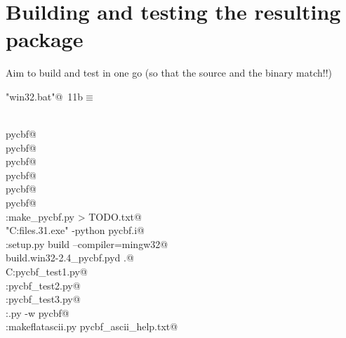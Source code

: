 \documentclass[10pt,a4paper,twoside,notitlepage]{article}
\begin{document}
\section{Building and testing the resulting package}

Aim to build and test in one go (so that the source and the binary match!!)

\begin{flushleft} \small
\begin{minipage}{\linewidth}\label{scrap10}\raggedright\small
{} \verb@"win32.bat"@\nobreak\ {\footnotesize {11b}}$\equiv$
\vspace{-1ex}
\begin{list}{}{} \item
\mbox{}\verb@@\\
\mbox{}\verb@nuweb pycbf@\\
\mbox{}\verb@latex pycbf@\\
\mbox{}\verb@nuweb pycbf@\\
\mbox{}\verb@latex pycbf@\\
\mbox{}\verb@dvipdfm pycbf@\\
\mbox{}\verb@nuweb pycbf@\\
\mbox{}\verb@C:\python make_pycbf.py > TODO.txt@\\
\mbox{}\verb@"C:\program files.31\swig.exe" -python pycbf.i@\\
\mbox{}\verb@C:\python setup.py build --compiler=mingw32@\\
\mbox{}\verb@copy build\lib.win32-2.4\_pycbf.pyd .@\\
\mbox{}\verb@REM C:\python pycbf_test1.py@\\
\mbox{}\verb@C:\python pycbf_test2.py@\\
\mbox{}\verb@C:\python pycbf_test3.py@\\
\mbox{}\verb@C:\lib\pydoc.py -w pycbf@\\
\mbox{}\verb@C:\python makeflatascii.py pycbf_ascii_help.txt@\\
\mbox{}\verb@@{\NWsep}
\end{list}
\vspace{-1.5ex}
\footnotesize
\begin{list}{}{\setlength{\itemsep}{-\parsep}\setlength{\itemindent}{-\leftmargin}}

\item{}
\end{list}
\end{minipage}\vspace{4ex}
\end{flushleft}
\end{document}
